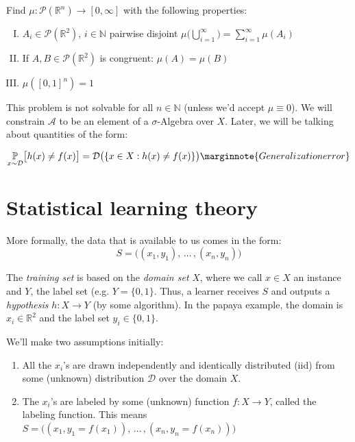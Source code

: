 \documentclass{scrarticle}
\begin{document}
Find $\mu:\mathcal{P}(\mathbb{R}^n) \to [0,\infty]$ with the following properties: 
\begin{enumerate}[I.]
    \item $A_i \in \mathcal{P}(\mathbb{R}^2),\, i \in \mathbb{N}$ pairwise disjoint $\mu \big (\bigcup_{i=1}^\infty \Big ) = \sum_{i=1}^\infty \mu(A_i)$
    \item If $A,B \in \mathcal{P}(\mathbb{R}^2)$ is congruent: $\mu(A) = \mu(B)$
    \item $\mu ({[0,1]}^n)=1$
\end{enumerate}

This problem is not solvable for all $n \in \mathbb{N}$ (unless we'd accept $\mu \equiv 0$). We will constrain $\mathcal{A}$ to be an element of a $\sigma$-Algebra over $X$. Later, we will be talking about quantities of the form:

\begin{equation}
    \underset{x \sim \mathcal{D}}{\mathbb{P}}\big [h(x) \neq f(x) \big] = \mathcal{D} \big (\{x \in X: h(x) \neq f(x) \} \big ) \marginnote{\small{Generali\-zation error}}
\end{equation}

\section{Statistical learning theory}
More formally, the data that is available to us comes in the form: 
\begin{equation}
    S=\big ((x_1, y_1),\, \ldots \, , (x_n, y_n) \big)
\end{equation}

The \textit{training set} is based on the \textit{domain set} $X$, where we call $x \in X $ an instance and $Y$, the label set (e.g. $Y=\{0,1\}$. Thus, a learner receives $S$ and outputs a \textit{hypothesis} $h:X \to Y$ (by some algorithm). In the papaya example, the domain is $x_i \in \mathbb{R}^2$ and the label set $y_i \in \{0,1\}$.

We'll make two assumptions initially:
\begin{enumerate}
    \item All the $x_i$'s are drawn independently and identically distributed (iid) from some (unknown) distribution $\mathcal{D}$ over the domain $X$.
    \item The $x_i$'s are labeled by some (unknown) function $f: X \to Y$, called the labeling function. This means $S=\big ((x_1, y_1=f(x_1)),\, \ldots \, , (x_n, y_n = f(x_n)) \big )$
\end{enumerate}
\end{document}
